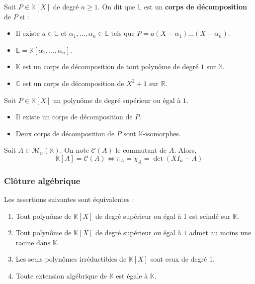 	\begin{definition}
		Soit $P \in \mathbb{K}[X]$ de degré $n \geq 1$. On dit que $\mathbb{L}$ est un \textbf{corps de décomposition} de $P$ si :
		\begin{itemize}
			\item Il existe $a \in \mathbb{L}$ et $\alpha_1, \dots, \alpha_n \in \mathbb{L}$ tels que $P = a(X-\alpha_1) \dots (X-\alpha_n)$.
			\item $\mathbb{L} = \mathbb{K}[\alpha_1, \dots, \alpha_n]$.
		\end{itemize}
	\end{definition}

	\begin{example}
		\begin{itemize}
			\item $\mathbb{K}$ est un corps de décomposition de tout polynôme de degré $1$ sur $\mathbb{K}$.
			\item $\mathbb{C}$ est un corps de décomposition de $X^2+1$ sur $\mathbb{R}$.
		\end{itemize}
	\end{example}

	\begin{theorem}
		Soit $P \in \mathbb{K}[X]$ un polynôme de degré supérieur ou égal à $1$.
		\begin{itemize}
			\item Il existe un corps de décomposition de $P$.
			\item Deux corps de décomposition de $P$ sont $\mathbb{K}$-isomorphes.
		\end{itemize}
	\end{theorem}


	\begin{application}
		Soit $A \in \mathcal{M}_n(\mathbb{K})$. On note $\mathcal{C}(A)$ le commutant de $A$. Alors,
		\[ \mathbb{K}[A] = \mathcal{C}(A) \iff \pi_A = \chi_A = \det(XI_n - A) \]
	\end{application}

	\subsubsection{Clôture algébrique}


	\begin{proposition}
		\label{125-3}
		Les assertions suivantes sont équivalentes :
		\begin{enumerate}[label=(\roman*)]
			\item Tout polynôme de $\mathbb{K}[X]$ de degré supérieur ou égal à $1$ est scindé sur $\mathbb{K}$.
			\item Tout polynôme de $\mathbb{K}[X]$ de degré supérieur ou égal à $1$ admet au moins une racine dans $\mathbb{K}$.
			\item Les seuls polynômes irréductibles de $\mathbb{K}[X]$ sont ceux de degré $1$.
			\item Toute extension algébrique de $\mathbb{K}$ est égale à $\mathbb{K}$.
		\end{enumerate}
	\end{proposition}

